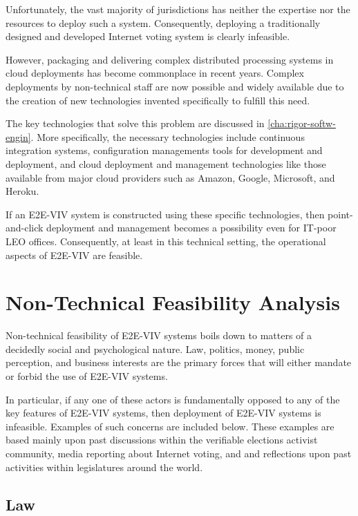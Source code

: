 Unfortunately, the vast majority of jurisdictions has neither the
expertise nor the resources to deploy such a system. Consequently,
deploying a traditionally designed and developed Internet voting
system is clearly infeasible.

However, packaging and delivering complex distributed processing
systems in cloud deployments has become commonplace in recent years.
Complex deployments by non-technical staff are now possible and widely
available due to the creation of new technologies invented
specifically to fulfill this need.

The key technologies that solve this problem are discussed in
\autoref{cha:rigor-softw-engin}.  More specifically, the necessary
technologies include continuous integration systems, configuration
managements tools for development and deployment, and cloud deployment
and management technologies like those available from major cloud
providers such as Amazon, Google, Microsoft, and Heroku.

If an E2E-VIV system is constructed using these specific technologies,
then point-and-click deployment and management becomes a possibility
even for IT-poor LEO offices.  Consequently, at least in this
technical setting, the operational aspects of E2E-VIV are feasible.

\section{Non-Technical Feasibility Analysis}

Non-technical feasibility of E2E-VIV systems boils down to matters of
a decidedly social and psychological nature.  Law, politics, money,
public perception, and business interests are the primary forces that
will either mandate or forbid the use of E2E-VIV systems.

In particular, if any one of these actors is fundamentally opposed to
any of the key features of E2E-VIV systems, then deployment of E2E-VIV
systems is infeasible. Examples of such concerns are included below.
These examples are based mainly upon past discussions within the
verifiable elections activist community, media reporting about
Internet voting, and and reflections upon past activities within
legislatures around the world.

\subsection{Law}

